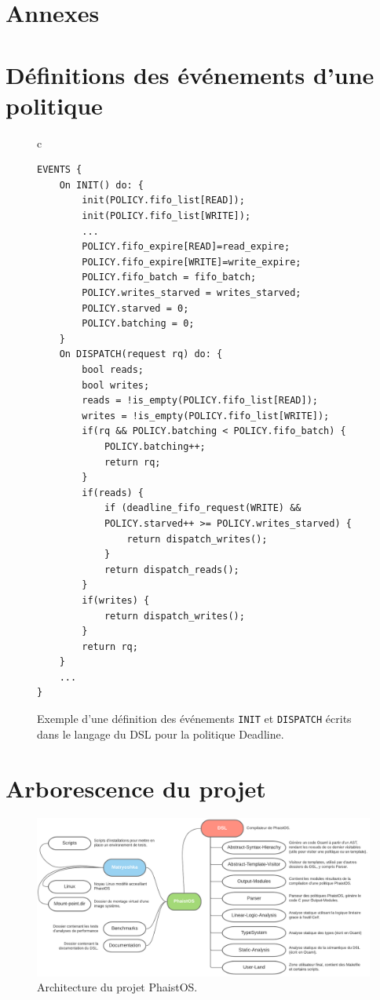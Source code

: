 \section{Annexes}
\label{appendix}
\appendix

\section*{Définitions des événements d'une politique}
\begin{figure}[h!t]
    \centering
    \begin{tabular}{c}
        \begin{lstlisting}[language=Phaistos, linewidth=13cm]
EVENTS {
    On INIT() do: {
        init(POLICY.fifo_list[READ]); 
        init(POLICY.fifo_list[WRITE]);
        ...
        POLICY.fifo_expire[READ]=read_expire;
        POLICY.fifo_expire[WRITE]=write_expire; 
        POLICY.fifo_batch = fifo_batch;
        POLICY.writes_starved = writes_starved;
        POLICY.starved = 0;
        POLICY.batching = 0;
    }
    On DISPATCH(request rq) do: {
        bool reads; 
        bool writes;
        reads = !is_empty(POLICY.fifo_list[READ]);
        writes = !is_empty(POLICY.fifo_list[WRITE]);
        if(rq && POLICY.batching < POLICY.fifo_batch) {
            POLICY.batching++;
            return rq;
        }
        if(reads) {
            if (deadline_fifo_request(WRITE) &&
            POLICY.starved++ >= POLICY.writes_starved) {
                return dispatch_writes();
            }
            return dispatch_reads();
        }
        if(writes) {
            return dispatch_writes();
        }
        return rq; 
    }
    ...
}
        \end{lstlisting}
    \end{tabular}
    \caption{Exemple d'une définition des événements \texttt{INIT} et \texttt{DISPATCH} écrits dans le langage du DSL pour la politique Deadline.}
    \label{fig:event-code}
\end{figure}

\newpage
\section*{Arborescence du projet}
\begin{figure}[h!t] \centering
    \includegraphics[width=\textwidth]{images/arch}
    \caption{Architecture du projet PhaistOS.}
    \label{fig:arch}
\end{figure}

